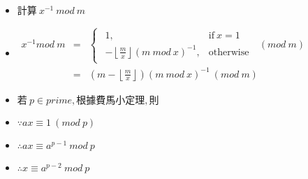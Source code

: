 \begin{itemize}

\item $計算 \ x^{-1} \ mod \ m$
\item $\begin{array}{rcl}
            x^{-1} mod \ m & = & \begin{cases} \begin{array}{cl}
                                 1, & \text{if} \ x=1 \\
                                 -\left \lfloor\frac{m}{x} \right\rfloor(m \ mod \ x)^{-1}, & \text{otherwise}
                                 \end{array} \end{cases} \ (mod \ m) \\
               & = & (m-\left \lfloor\frac{m}{x} \right\rfloor)(m \ mod \ x)^{-1} \ (mod \ m)
       \end{array}$
 
\item $若 \ p \in prime, 根據費馬小定理, 則$
\item $\because ax \equiv 1 \ (mod \ p)$
\item $\therefore ax \equiv a^{p-1} \ mod \ p$
\item $\therefore x \equiv a^{p-2} \ mod \ p$ 
    
\end{itemize}